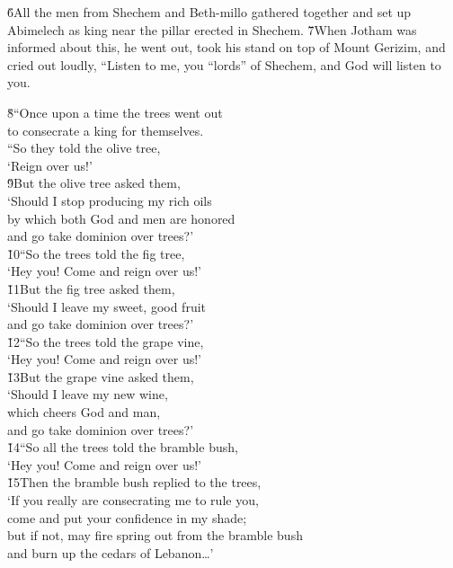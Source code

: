 \v{6}All the men from Shechem and Beth-millo gathered together and set up Abimelech as king near the pillar erected in Shechem. \v{7}When Jotham was informed about this, he went out, took his stand on top of Mount Gerizim, and cried out loudly, ``Listen to me, you ``lords'' of Shechem, and God will listen to you.

\begin{poetry}
\poeml \v{8}``Once upon a time the trees went out \\
\poemll    to consecrate a king for themselves. \\
\poeml ``So they told the olive tree, \\
\poemll    `Reign over us!' \\
\poeml \v{9}But the olive tree asked them, \\
\poemll    `Should I stop producing my rich oils \\
\poemlll       by which both God and men are honored \\
\poemll    and go take dominion over trees?' \\
\poeml \v{10}``So the trees told the fig tree, \\
\poemll    `Hey you! Come and reign over us!' \\
\poeml \v{11}But the fig tree asked them, \\
\poemll    `Should I leave my sweet, good fruit \\
\poemlll       and go take dominion over trees?' \\
\poeml \v{12}``So the trees told the grape vine, \\
\poemll    `Hey you! Come and reign over us!' \\
\poeml \v{13}But the grape vine asked them, \\
\poemll    `Should I leave my new wine, \\
\poemlll       which cheers God and man, \\
\poemll    and go take dominion over trees?' \\
\poeml \v{14}``So all the trees told the bramble bush, \\
\poemll    `Hey you! Come and reign over us!' \\
\poeml \v{15}Then the bramble bush replied to the trees, \\
\poemll    `If you really are consecrating me to rule you, \\
\poemlll       come and put your confidence in my shade; \\
\poemll    but if not, may fire spring out from the bramble bush \\
\poemlll       and burn up the cedars of Lebanon{\ldots}'
\end{poetry}


